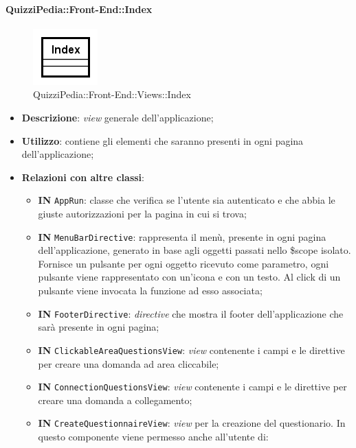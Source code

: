 	
	\paragraph{QuizziPedia::Front-End::Index}
	\begin{figure} [ht]
		\centering
		\includegraphics[scale=0.7]{UML/Classi/Front-End/QuizziPedia_Front-end_Views_Index.png}
		\caption{QuizziPedia::Front-End::Views::Index}
	\end{figure} \FloatBarrier
	\begin{itemize}
		\item \textbf{Descrizione}: \textit{view} generale dell'applicazione;
		\item \textbf{Utilizzo}: contiene gli elementi che saranno presenti in ogni pagina dell'applicazione;
		\item \textbf{Relazioni con altre classi}:
		\begin{itemize}
			\item \textbf{IN} \texttt{AppRun}: classe che verifica se l'utente sia autenticato e che abbia le giuste autorizzazioni per la pagina in cui si trova;
			\item \textbf{IN} \texttt{MenuBarDirective}: rappresenta il menù, presente in ogni pagina dell'applicazione, generato in base agli oggetti passati nello \$scope isolato. Fornisce un pulsante per ogni oggetto ricevuto come parametro, ogni pulsante viene rappresentato con un’icona e con un testo. Al click di un pulsante viene invocata la funzione ad esso associata;
			\item \textbf{IN} \texttt{FooterDirective}: \textit{directive} che mostra il footer dell'applicazione che sarà presente in ogni pagina;
			\item \textbf{IN} \texttt{ClickableAreaQuestionsView}: \textit{view} contenente i campi e le direttive per creare una domanda ad area cliccabile;
			\item \textbf{IN} \texttt{ConnectionQuestionsView}: \textit{view} contenente i campi e le direttive per creare una domanda a collegamento;
			\item \textbf{IN} \texttt{CreateQuestionnaireView}: \textit{view} per la creazione del questionario. In questo componente viene permesso anche all'utente di:
			\begin{itemize}

\end{itemize}
\end{itemize}
\end{itemize}
